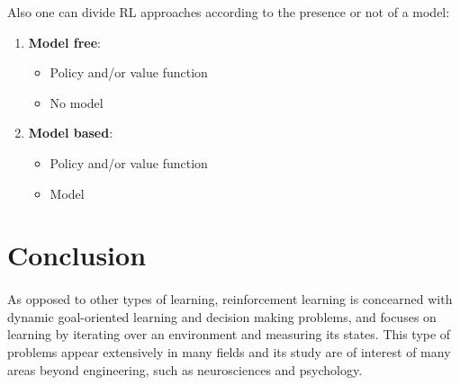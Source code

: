 \documentclass{article}
\begin{document}
Also one can divide RL approaches according to the presence or not of a model:
\begin{enumerate}
    \item \textbf{Model free}:
    \begin{itemize}
        \item Policy and/or value function
        \item No model
    \end{itemize}
    \item \textbf{Model based}:
    \begin{itemize}
        \item Policy and/or value function
        \item Model
    \end{itemize}
\end{enumerate}


\section{Conclusion}
\paragraph{}
As opposed to other types of learning, reinforcement learning is concearned with dynamic goal-oriented learning and decision making problems, and focuses on learning by iterating over an environment and measuring its states. This type of problems appear extensively in many fields and its study are of interest of many areas beyond engineering, such as neurosciences and psychology.
\end{document}
